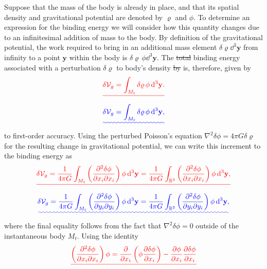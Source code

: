 \documentclass[a4paper,12pt]{paper}
\providecommand{\DIFadd}[1]{{\protect\color{blue}\uwave{#1}}} %
\providecommand{\DIFdel}[1]{{\protect\color{red}\sout{#1}}}                      %
\providecommand{\DIFaddbegin}{} %
\providecommand{\DIFaddend}{} %
\providecommand{\DIFdelbegin}{} %
\providecommand{\DIFdelend}{} %
\begin{document}
Suppose that the mass of the body is already in place, 
and that its spatial density and gravitational potential are denoted by $\varrho$ and $\phi$. To determine an 
expression for the binding energy we will consider how this quantity changes due to an infinitesimal addition 
of mass to the body. By definition of the gravitational potential, the work required to bring in an additional 
mass element $\delta\varrho \dd^{3}\mathbf{y}$ from infinity to a point $\mathbf{y}$ within the body is
 $\delta\varrho\,\phi\dd^{3}\mathbf{y}$. 
The \DIFdelbegin \DIFdel{total }\DIFdelend \DIFaddbegin \DIFadd{change in the }\DIFaddend binding energy associated with a perturbation $\delta\varrho$ to \DIFaddbegin \DIFadd{the }\DIFaddend body's density \DIFdelbegin \DIFdel{by }\DIFdelend is, therefore, given by
\DIFdelbegin \begin{displaymath}
\DIFdel{\delta\mathcal{V}_{g}=\int_{M_{t}}\delta\varrho\,\phi \dd^{3}\mathbf{y}.
}\end{displaymath}%
\DIFdelend \DIFaddbegin \begin{equation}
\DIFadd{\delta\mathcal{V}_{g}=\int_{M_{t}}\delta\varrho\,\phi \dd^{3}\mathbf{y},
\label{eq:11}
}\end{equation}\DIFaddend 
to first-order accuracy. Using the perturbed Poisson's equation $\nabla^{2}\delta\phi=4\pi G\delta\varrho$ for 
the resulting change in gravitational potential, we can write this increment to the binding energy as
\DIFdelbegin \begin{displaymath}
\DIFdel{\delta\mathcal{V}_{g}=\frac{1}{4\pi G}\int_{M_{t}}\left(\frac{\partial^{2}\delta\phi}{\partial x_{i}\partial x_{i}}\right)\phi
\dd^{3}\mathbf{y}=\frac{1}{4\pi G}\int_{\mathbb{R}^{3}}\left(\frac{\partial^{2}\delta\phi}{\partial x_{i}\partial x_{i}}\right)\phi\dd^{3}\mathbf{y},
}\end{displaymath}%
\DIFdelend \DIFaddbegin \begin{equation}
\DIFadd{\delta\mathcal{V}_{g}=\frac{1}{4\pi G}\int_{M_{t}}\left(\frac{\partial^{2}\delta\phi}{\partial y_{i}\partial y_{i}}\right)\phi
\dd^{3}\mathbf{y}=\frac{1}{4\pi G}\int_{\mathbb{R}^{3}}\left(\frac{\partial^{2}\delta\phi}{\partial y_{i}\partial y_{i}}\right)\phi\dd^{3}\mathbf{y},
\label{eq:12}
}\end{equation}\DIFaddend 
where the final equality follows from the fact that $\nabla^{2}\delta\phi=0$ outside of the instantaneous 
body $M_{t}$. Using the identity
\DIFdelbegin \begin{displaymath}
\DIFdel{\left(\frac{\partial^{2}\delta\phi}{\partial x_{i}\partial x_{i}}\right)\phi=\frac{\partial}{\partial x_{i}}
\left(\phi\frac{\partial\delta\phi}{\partial x_{i}}\right)-\frac{\partial\phi}{\partial x_{i}}\frac{\partial\delta\phi}{\partial x_{i}}
}\end{displaymath}%
\end{document}
